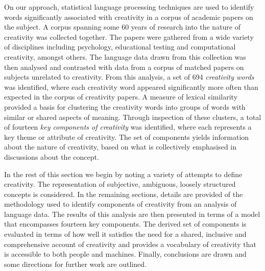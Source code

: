 \documentclass[10pt,letterpaper]{article}
\begin{document}
On our approach, statistical language processing techniques are used to identify words significantly associated with creativity in a corpus of academic papers on the subject. A corpus spanning some 60 years of research into the nature of creativity was collected together. The papers were gathered from a wide variety of disciplines including psychology, educational testing and computational creativity, amongst others. The language data drawn from this collection was then analysed and contrasted with data from a corpus of matched papers on subjects unrelated to creativity. From this analysis, a set of 694 {\em creativity words\/} was identified, where each creativity word appeared significantly more often than expected in the corpus of creativity papers. A measure of lexical similarity provided a basis for clustering the creativity words into groups of words with similar or shared aspects of meaning. Through inspection of these clusters, a total of fourteen {\em key components of creativity\/} was identified, where each represents a key theme or attribute of creativity. The set of components yields information about the nature of creativity, based on what is collectively emphasised in discussions about the concept. 


In the rest of this section we begin by noting a variety of attempts to define creativity. The representation of subjective, ambiguous, loosely structured concepts is considered.
In the remaining sections, details are provided of the methodology used to identify components of creativity from an analysis of language data. The results of this analysis are then presented in terms of a model that encompasses fourteen key components. The derived set of components is evaluated in terms of how well it satisfies the need for a shared, inclusive and comprehensive account of creativity and provides a vocabulary of creativity that is accessible to both people and machines. Finally, conclusions are drawn and some directions for further work are outlined.
\end{document}
